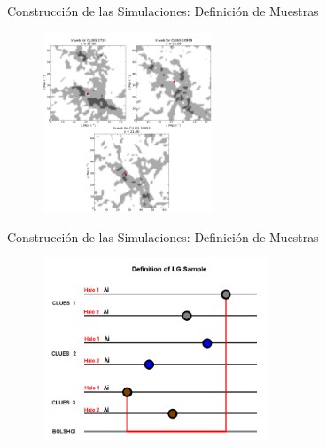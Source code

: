 \documentclass[8pt,fleqn]{beamer}
\begin{document}
\begin{frame}
\begin{block}{Construcción de las Simulaciones: Definición de Muestras}\justifying

\begin{figure}[htbp]
	\centering
	\includegraphics[trim = 0mm 10mm 0mm 10mm, clip, width=0.45\textwidth]
	{./figures/LG_Environment.png}
\end{figure}

\end{block}
\end{frame}
\begin{frame}
\begin{block}{Construcción de las Simulaciones: Definición de Muestras}\justifying

\begin{figure}[htbp]
	\centering
	\includegraphics[trim = 0mm 0mm 0mm 0mm, clip, width=0.6\textwidth]
	{./figures/LG_definition.png}
\end{figure}

\end{block}
\end{frame}
\end{document}
